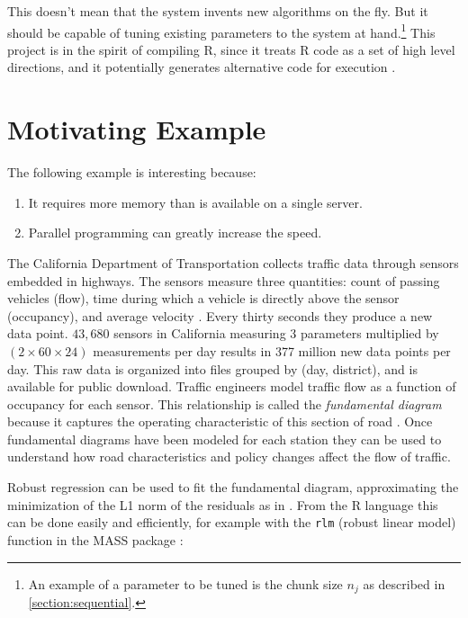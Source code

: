 \documentclass[12pt]{article}
\begin{document}
This doesn't mean that the system invents new algorithms on
the fly. But it should be capable of tuning existing parameters to the
system at hand.\footnote{An example of a parameter to be tuned is the chunk size
$n_j$ as described in \ref{section:sequential}.}
This project is in the spirit of compiling R, since it treats R code as
a set of high level directions, and it potentially generates alternative
code for execution \cite{lang2014enhancing}.

\section{Motivating Example}
\label{sec:pems}

The following example is interesting because:
\begin{enumerate}
    \item It requires more memory than is available on a single server.
    \item Parallel programming can greatly increase the speed.
\end{enumerate}

The California Department of Transportation collects traffic data through
sensors embedded in highways. The sensors measure three quantities: count
of passing vehicles (flow), time during which a vehicle is directly above the
sensor (occupancy), and average velocity \cite{jia2001pems}.  Every thirty
seconds they produce a new data point. $43,680$ sensors in California
measuring 3 parameters multiplied by $(2 \times 60 \times 24)$ measurements
per day results in 377 million new data points per day.  This raw data is
organized into files grouped by (day, district), and is available for
public download.  Traffic engineers model traffic flow as a function of
occupancy for each sensor. This relationship is called the \emph{fundamental
diagram} because it captures the operating characteristic of this section
of road \cite{daganzo1997fundamentals}. Once fundamental diagrams
have been modeled for each station they can be used to understand how road
characteristics and policy changes affect the flow of traffic.

Robust regression can be used to fit the fundamental diagram, approximating
the minimization of the L1 norm of the residuals as in
\cite{li2011fundamental}.  From the R language this can be done easily and
efficiently, for example with the \texttt{rlm} (robust linear model)
function in the MASS package \cite{venables2013modern}:
\end{document}
